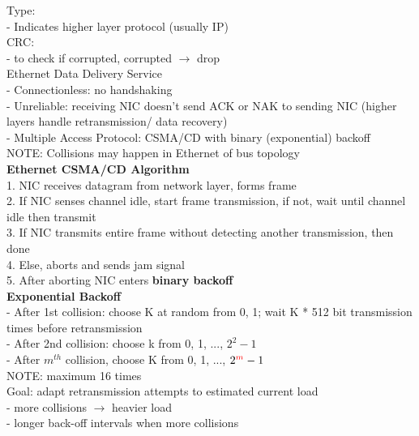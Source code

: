 \documentclass[10pt, a4paper]{article}
\newcommand{\highlight}[1]{{\color{red}\textbf{#1}}}
\newcommand{\red}[1]{{\color{red}#1}}
\newcommand{\green}[1]{{\color{ForestGreen}#1}}
\begin{document}
\begin{multicols*}{3}
		Type:\\
		- Indicates higher layer protocol (usually IP)\\

		CRC:\\
		- to check if corrupted, corrupted $\rightarrow$ drop\\

		Ethernet Data Delivery Service\\
		- \red{Connectionless}: no handshaking\\
		- \red{Unreliable}: receiving NIC doesn't send ACK or NAK to sending NIC (higher layers handle retransmission/ data recovery)\\
		- \red{Multiple Access Protocol:} CSMA/CD with \red{binary (exponential) backoff}\\
		\red{NOTE}: Collisions may happen in Ethernet of bus topology\\

		\textbf{Ethernet CSMA/CD Algorithm}\\
		1. NIC receives datagram from network layer, forms frame\\
		2. If NIC senses channel idle, start frame transmission, if not, wait until channel idle then transmit\\
		3. If NIC transmits entire frame without detecting another transmission, then done\\
		4. Else, \red{aborts and sends jam signal}\\
		5. After aborting NIC enters \highlight{binary backoff}\\

		\textbf{Exponential Backoff}\\
		- After 1st collision: choose \red{K} at random from {0, 1}; wait \red{K} * 512 bit transmission times before retransmission\\
		- After 2nd collision: choose \red{k} from {0, 1, ..., $2^{2}-1$}\\
		- After \red{$m^{th}$} collision, choose \red{K} from {0, 1, ..., $2^{\red{m}} - 1$}\\
		NOTE: maximum 16 times\\
		\green{Goal:} adapt retransmission attempts to estimated current load\\
		- more collisions $\rightarrow$ heavier load\\
		- longer back-off intervals when more collisions\\


\end{multicols*}
\end{document}
